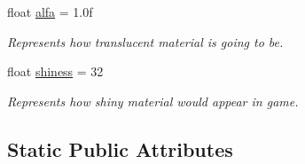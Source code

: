 \begin{DoxyCompactItemize}
float \mbox{\hyperlink{struct_material_ab331a289b85cc07810ded7f4ebb66175}{alfa}} = 1.\+0f
\begin{DoxyCompactList}\small\item\em Represents how translucent material is going to be. \end{DoxyCompactList}\item 
float \mbox{\hyperlink{struct_material_ac40b4d892e9bff09f793d86ca1f3257e}{shiness}} = 32
\begin{DoxyCompactList}\small\item\em Represents how shiny material would appear in game. \end{DoxyCompactList}\end{DoxyCompactItemize}
\subsection*{Static Public Attributes}
